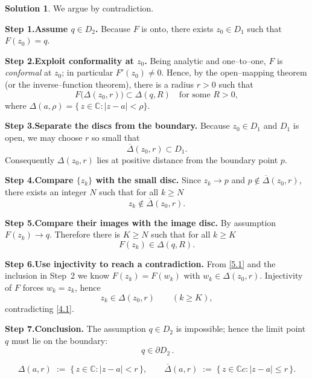 \documentclass[12pt]{article}
\theoremstyle{definition} %
\newtheorem{solution}{Solution}
\theoremstyle{plain} %
\begin{document}
        \begin{solution}
        We argue by contradiction.
        
        \medskip
        \textbf{Step 1.\;Assume \(q\in D_{2}\).}
        Because \(F\) is onto, there exists
        \(z_{0}\in D_{1}\) such that
        \(F(z_{0})=q\).
        
        \medskip
        \textbf{Step 2.\;Exploit conformality at \(z_{0}\).}
        Being analytic and one–to–one, \(F\) is
        \emph{conformal} at \(z_{0}\);
        in particular \(F'(z_{0})\neq0\).
        Hence, by the open–mapping theorem (or the inverse–function theorem),
        there is a radius \(r>0\) such that
        \[
           F\bigl(\Delta(z_{0},r)\bigr)\subset\Delta(q,R)
           \quad\text{for some }R>0,
        \]
        where \(\Delta(a,\rho)=\{\,z\in\mathbb{C}:|z-a|<\rho\}\).
        
        \medskip
        \textbf{Step 3.\;Separate the discs from the boundary.}
        Because \(z_{0}\in D_{1}\) and \(D_{1}\) is open,
        we may choose \(r\) so small that
        \[
           \overline{\Delta}(z_{0},r)\subset D_{1}.
        \tag{3.1}
        \]
        Consequently \(\Delta(z_{0},r)\) lies at
        positive distance from the boundary point \(p\).
        
        \medskip
        \textbf{Step 4.\;Compare \(\{z_{k}\}\) with the small disc.}
        Since \(z_{k}\to p\) and \(p\notin\overline{\Delta}(z_{0},r)\),
        there exists an integer \(N\) such that for all \(k\ge N\)
        \[
           z_{k}\notin\overline{\Delta}(z_{0},r).
        \tag{4.1}
        \]
        
        \medskip
        \textbf{Step 5.\;Compare their images with the image disc.}
        By assumption \(F(z_{k})\to q\).
        Therefore there is \(K\ge N\) such that for all \(k\ge K\)
        \[
           F(z_{k})\in\Delta(q,R).
        \tag{5.1}
        \]
        
        \medskip
        \textbf{Step 6.\;Use injectivity to reach a contradiction.}
        From \eqref{5.1} and the inclusion in Step~2 we know
        \(F(z_{k})=F(w_{k})\) with
        \(w_{k}\in\Delta(z_{0},r)\).
        Injectivity of \(F\) forces \(w_{k}=z_{k}\), hence
        \[
           z_{k}\in\Delta(z_{0},r)\qquad(k\ge K),
        \]
        contradicting \eqref{4.1}.
        
        \medskip
        \textbf{Step 7.\;Conclusion.}
        The assumption \(q\in D_{2}\) is impossible;
        hence the limit point \(q\) must lie on the boundary:
        \[
           \boxed{\,q\in\partial D_{2}\,}.
        \]
        
        \end{solution}
        \[
          \Delta(a,r)  \;:=\; \{\,z\in\mathbb{{C}} : |z-a|<r\,\},
          \qquad
          \overline{\Delta}(a,r) \;:=\; \{\,z\in\mathbb{{C}}c : |z-a|\le r\,\}.
       \]
       
\end{document}
